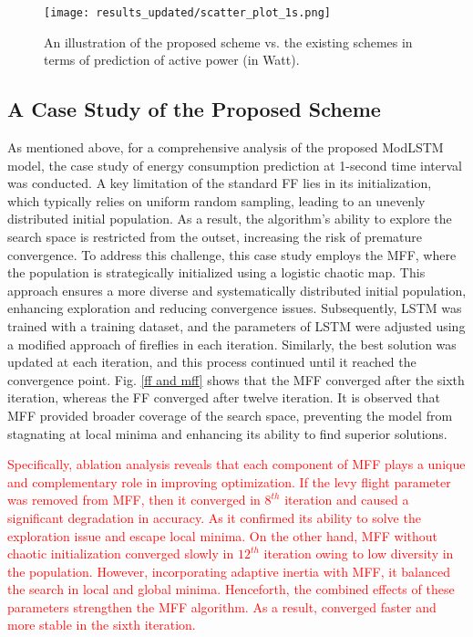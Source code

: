 \documentclass[journal]{IEEEtran}
\begin{document}
\begin{figure}[!h]
	\centering
	\texttt{[image: results\_updated/scatter\_plot\_1s.png]}
	\caption{An illustration of the proposed scheme vs. the existing schemes in terms of prediction of active power (in Watt).}
	\label{SCATTER PLOT}
	\vspace{-15pt}
\end{figure}


\subsection{A Case Study of the Proposed Scheme}
As mentioned above, for a comprehensive analysis of the proposed ModLSTM model, the case study of energy consumption prediction at 1-second time interval was conducted. A key limitation of the standard FF lies in its initialization, which typically relies on uniform random sampling, leading to an unevenly distributed initial population. As a result, the algorithm's ability to explore the search space is restricted from the outset, increasing the risk of premature convergence. To address this challenge, this case study employs the MFF, where the population is strategically initialized using a logistic chaotic map. This approach ensures a more diverse and systematically distributed initial population, enhancing exploration and reducing convergence issues. Subsequently, LSTM was trained with a training dataset, and the parameters of LSTM were adjusted using a modified approach of fireflies in each iteration. Similarly, the best solution was updated at each iteration, and this process continued until it reached the convergence point. Fig. \ref{ff and mff} shows that the MFF converged after the sixth iteration, whereas the FF converged after twelve iteration. It is observed that MFF provided broader coverage of the search space, preventing the model from stagnating at local minima and enhancing its ability to find superior solutions.

\textcolor{red}{Specifically, ablation analysis reveals that each component of MFF plays a unique and complementary role in improving optimization. If the levy flight parameter was removed from MFF, then it converged in $8^{th}$ iteration and caused a significant degradation in accuracy. As it confirmed its ability to solve the exploration issue and escape local minima. On the other hand, MFF without chaotic initialization converged slowly in $12^{th}$ iteration owing to low diversity in the population. However, incorporating adaptive inertia with MFF, it balanced the search in local and global minima. Henceforth, the combined effects of these parameters strengthen the MFF algorithm. As a result, converged faster and more stable in the sixth iteration.}
\end{document}
